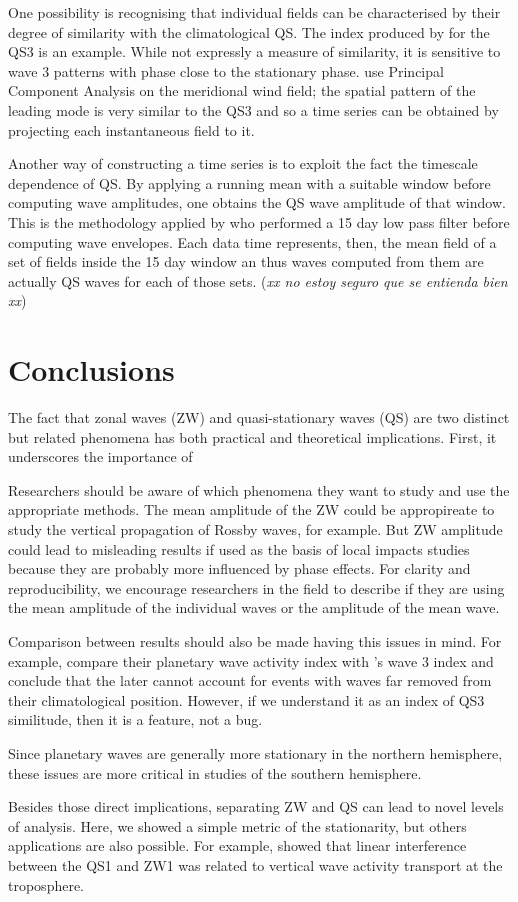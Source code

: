 \documentclass[draft,linenumbers]{agujournal2018}
\begin{document}
One possibility is recognising that individual fields can be
characterised by their degree of similarity with the climatological QS.
The index produced by \citet{Raphael2004} for the QS3 is an example.
While not expressly a measure of similarity, it is sensitive to wave 3
patterns with phase close to the stationary phase. \citet{Yuan2008} use
Principal Component Analysis on the meridional wind field; the spatial
pattern of the leading mode is very similar to the QS3 and so a time
series can be obtained by projecting each instantaneous field to it.

Another way of constructing a time series is to exploit the fact the
timescale dependence of QS. By applying a running mean with a suitable
window before computing wave amplitudes, one obtains the QS wave
amplitude of that window. This is the methodology applied by
\citet{Wolf2018} who performed a 15 day low pass filter before computing
wave envelopes. Each data time represents, then, the mean field of a set
of fields inside the 15 day window an thus waves computed from them are
actually QS waves for each of those sets. (\emph{xx no estoy seguro que
se entienda bien xx})

\section{Conclusions}

The fact that zonal waves (ZW) and quasi-stationary waves (QS) are two
distinct but related phenomena has both practical and theoretical
implications. First, it underscores the importance of

Researchers should be aware of which phenomena they want to study and
use the appropriate methods. The mean amplitude of the ZW could be
appropireate to study the vertical propagation of Rossby waves, for
example. But ZW amplitude could lead to misleading results if used as
the basis of local impacts studies because they are probably more
influenced by phase effects. For clarity and reproducibility, we
encourage researchers in the field to describe if they are using the
mean amplitude of the individual waves or the amplitude of the mean
wave.

Comparison between results should also be made having this issues in
mind. For example, \citet{Irving2015} compare their planetary wave
activity index with \citet{Raphael2004}'s wave 3 index and conclude that
the later cannot account for events with waves far removed from their
climatological position. However, if we understand it as an index of QS3
similitude, then it is a feature, not a bug.

Since planetary waves are generally more stationary in the northern
hemisphere, these issues are more critical in studies of the southern
hemisphere.

Besides those direct implications, separating ZW and QS can lead to
novel levels of analysis. Here, we showed a simple metric of the
stationarity, but others applications are also possible. For example,
\citet{Smith2012} showed that linear interference between the QS1 and
ZW1 was related to vertical wave activity transport at the troposphere.


\end{document}
